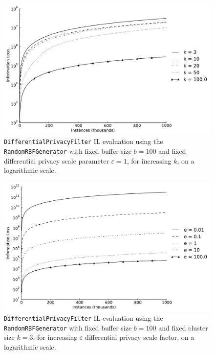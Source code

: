 \begin{figure}[h]
	\centering
	\includegraphics[width=0.9\linewidth]{figures/il-log_dp-e1-random.pdf}
	\caption[Differential privacy IL evaluation ($b = 100,~\varepsilon = 1$).]{\texttt{DifferentialPrivacyFilter} IL evaluation using the \texttt{RandomRBFGenerator} with fixed buffer size $b = 100$ and fixed differential privacy scale parameter $\varepsilon = 1$, for increasing $k$, on a logarithmic scale.}
	\label{fig:results-il-dp-e1}
\end{figure}

\begin{figure}[h]
	\centering
	\includegraphics[width=0.9\linewidth]{figures/il-log_dp-k3-random.pdf}
	\caption[Differential privacy IL evaluation ($b = 100,~k = 3$).]{\texttt{DifferentialPrivacyFilter} IL evaluation using the \texttt{RandomRBFGenerator} with fixed buffer size $b = 100$ and fixed cluster size $k = 3$, for increasing $\varepsilon$ differential privacy scale factor, on a logarithmic scale.}
	\label{fig:results-il-dp-k3}
\end{figure}
